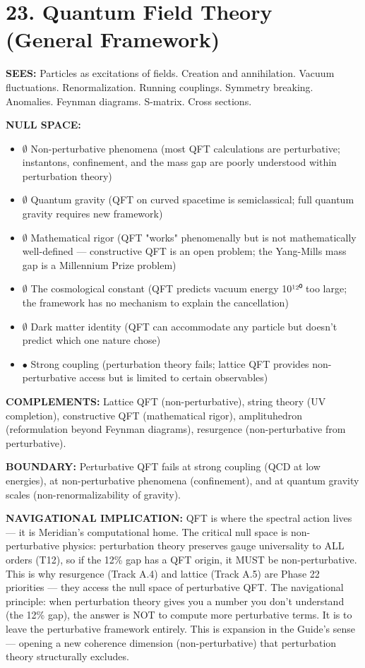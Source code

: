 \bigskip\noindent\makebox[\textwidth]{\color{rulegray}\rule{5cm}{0.3pt}}\bigskip


\section*{23. Quantum Field Theory (General Framework)}


\textbf{SEES:} Particles as excitations of fields. Creation and annihilation. Vacuum fluctuations. Renormalization. Running couplings. Symmetry breaking. Anomalies. Feynman diagrams. S-matrix. Cross sections.


\textbf{NULL SPACE:}

\begin{itemize}[nosep,leftmargin=*]
  \item $\emptyset$ Non-perturbative phenomena (most QFT calculations are perturbative; instantons, confinement, and the mass gap are poorly understood within perturbation theory)
  \item $\emptyset$ Quantum gravity (QFT on curved spacetime is semiclassical; full quantum gravity requires new framework)
  \item $\emptyset$ Mathematical rigor (QFT "works" phenomenally but is not mathematically well-defined — constructive QFT is an open problem; the Yang-Mills mass gap is a Millennium Prize problem)
  \item $\emptyset$ The cosmological constant (QFT predicts vacuum energy 10¹²⁰ too large; the framework has no mechanism to explain the cancellation)
  \item $\emptyset$ Dark matter identity (QFT can accommodate any particle but doesn't predict which one nature chose)
  \item $\bullet$ Strong coupling (perturbation theory fails; lattice QFT provides non-perturbative access but is limited to certain observables)
\end{itemize}


\textbf{COMPLEMENTS:} Lattice QFT (non-perturbative), string theory (UV completion), constructive QFT (mathematical rigor), amplituhedron (reformulation beyond Feynman diagrams), resurgence (non-perturbative from perturbative).


\textbf{BOUNDARY:} Perturbative QFT fails at strong coupling (QCD at low energies), at non-perturbative phenomena (confinement), and at quantum gravity scales (non-renormalizability of gravity).


\textbf{NAVIGATIONAL IMPLICATION:} QFT is where the spectral action lives — it is Meridian's computational home. The critical null space is non-perturbative physics: perturbation theory preserves gauge universality to ALL orders (T12), so if the 12\% gap has a QFT origin, it MUST be non-perturbative. This is why resurgence (Track A.4) and lattice (Track A.5) are Phase 22 priorities — they access the null space of perturbative QFT. The navigational principle: when perturbation theory gives you a number you don't understand (the 12\% gap), the answer is NOT to compute more perturbative terms. It is to leave the perturbative framework entirely. This is expansion in the Guide's sense — opening a new coherence dimension (non-perturbative) that perturbation theory structurally excludes.



